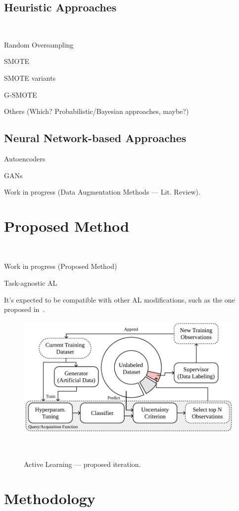\documentclass[parskip=full]{scrartcl}
\begin{document}
\subsection{Heuristic Approaches}~\label{sec:heuristic}

Random Oversampling

SMOTE

SMOTE variants

G-SMOTE

Others (Which? Probabilistic/Bayesian approaches, maybe?)

\subsection{Neural Network-based Approaches}

Autoencoders

GANs

Work in progress (Data Augmentation Methods --- Lit. Review).

\section{Proposed Method}~\label{sec:proposed_method}

Work in progress (Proposed Method)

Task-agnostic AL

It's expected to be compatible with other AL modifications, such as the one
proposed in~\cite{Yoo2019}.

\begin{figure}[H]
	\centering
	\includegraphics[width=.75\linewidth]{../analysis/al_proposed}
    \caption{%
        Active Learning --- proposed iteration.
    }~\label{fig:al_proposed}
\end{figure}


\section{Methodology}~\label{sec:methodology}
\end{document}
